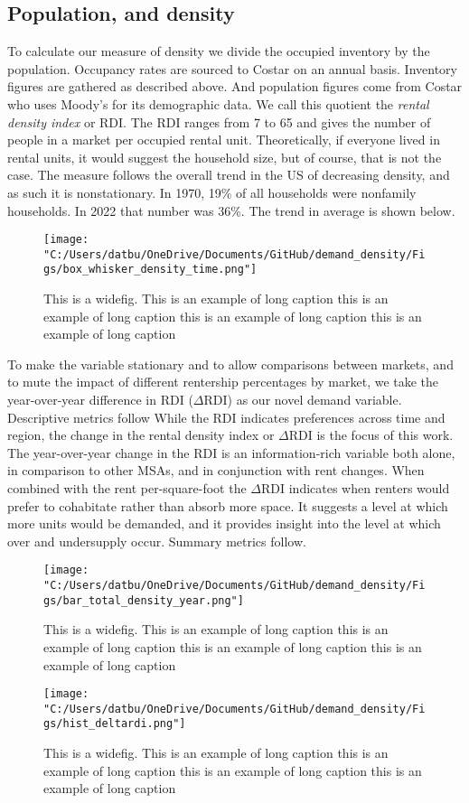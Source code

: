 \documentclass[sn-mathphys-num]{sn-jnl}%
\theoremstyle{thmstyleone}%
\theoremstyle{thmstyletwo}%
\theoremstyle{thmstylethree}%
\begin{document}
\subsection{Population, and density}
To calculate our measure of density we divide the occupied inventory by the population. Occupancy rates are sourced to Costar on an annual basis. Inventory figures are gathered as described above. And population figures come from Costar who uses Moody's for its demographic data. We call this quotient the \textit{rental density index} or RDI. The RDI ranges from 7 to 65 and gives the number of people in a market per occupied rental unit. Theoretically, if everyone lived in rental units, it would suggest the household size, but of course, that is not the case. The measure follows the overall trend in the US of decreasing density, and as such it is nonstationary. In 1970, 19\% of all households were nonfamily households. In 2022 that number was 36\%. The trend in average is shown below.

\begin{figure}[H]
	\centering
	\texttt{[image: "C:/Users/datbu/OneDrive/Documents/GitHub/demand\_density/Figs/box\_whisker\_density\_time.png"]}
	\caption{This is a widefig. This is an example of long caption this is an example of long caption  this is an example of long caption this is an example of long caption}\label{fig1}
\end{figure}

To make the variable stationary and to allow comparisons between markets, and to mute the impact of different rentership percentages by market, we take the year-over-year difference in RDI ($\Delta\text{RDI}$) as our novel demand variable. Descriptive metrics follow
While the RDI indicates preferences across time and region, the change in the rental density index or $\Delta\text{RDI}$ is the focus of this work. The year-over-year change in the RDI is an information-rich variable both alone, in comparison to other MSAs, and in conjunction with rent changes. When combined with the rent per-square-foot the $\Delta\text{RDI}$ indicates when renters would prefer to cohabitate rather than absorb more space. It suggests a level at which more units would be demanded, and it provides insight into the level at which over and undersupply occur. 
Summary metrics follow.

\begin{figure}[H]
	\centering
	\texttt{[image: "C:/Users/datbu/OneDrive/Documents/GitHub/demand\_density/Figs/bar\_total\_density\_year.png"]}
	\caption{This is a widefig. This is an example of long caption this is an example of long caption  this is an example of long caption this is an example of long caption}\label{fig2}
\end{figure}
\begin{figure}[H]
	\centering
	\texttt{[image: "C:/Users/datbu/OneDrive/Documents/GitHub/demand\_density/Figs/hist\_deltardi.png"]}
	\caption{This is a widefig. This is an example of long caption this is an example of long caption  this is an example of long caption this is an example of long caption}\label{fig3}
\end{figure}
\end{document}
